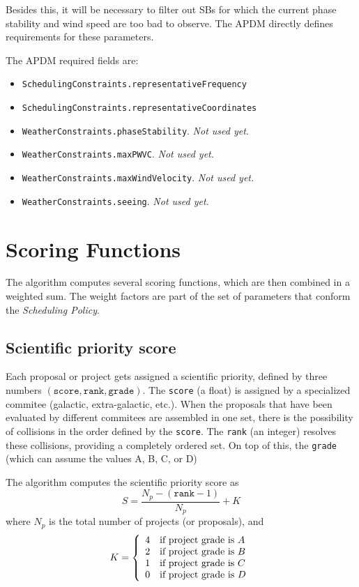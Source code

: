\documentclass{article}
\begin{document}
Besides this, it will be necessary to filter out SBs for which the
current phase stability  and wind speed are too bad to observe.
The APDM directly defines requirements for these parameters.

The APDM required fields are:
\begin{itemize}
\item {\tt SchedulingConstraints.representativeFrequency}
\item {\tt SchedulingConstraints.representativeCoordinates}
\item {\tt WeatherConstraints.phaseStability}. {\em Not used yet.}
\item {\tt WeatherConstraints.maxPWVC}. {\em Not used yet.}
\item {\tt WeatherConstraints.maxWindVelocity}. {\em Not used yet.}
\item {\tt WeatherConstraints.seeing}. {\em Not used yet.}
\end{itemize}

\section{Scoring Functions}

The algorithm computes several scoring functions, which are then combined in a
weighted sum. The weight factors are part of the set of parameters that conform
the {\em Scheduling Policy}.

\subsection{Scientific priority score}

Each proposal or project gets assigned a scientific priority, defined by three numbers
$(\mathtt{score},\mathtt{rank},\mathtt{grade})$. The {\tt score} (a float) is assigned by
a specialized commitee (galactic, extra-galactic, etc.). When the proposals that have
been evaluated by different commitees are assembled in one set, there is the possibility
of collisions in the order defined by the {\tt score}. The {\tt rank} (an integer) resolves these
collisions, providing a completely ordered set. On top of this, the {\tt grade} (which can assume
the values A, B, C, or D)

The algorithm computes the scientific priority score as
$$
S = \frac{N_p - (\mathtt{rank} - 1)}{N_p} + K
$$
where $N_p$ is the total number of projects (or proposals), and \\
$$
K = \left\{
    \begin{array}{l l}
    4 & \text{if project grade is $A$} \\
    2 & \text{if project grade is $B$}\\
    1 & \text{if project grade is $C$}\\
    0 & \text{if project grade is $D$}
    \end{array} \right . 
$$
\end{document}
